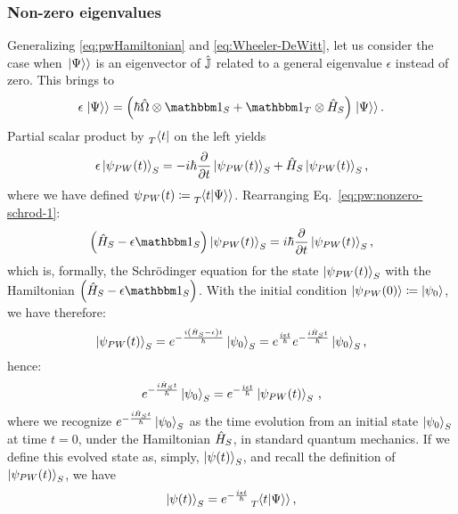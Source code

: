 \subsubsection{Non-zero eigenvalues}
Generalizing \eqref{eq:pwHamiltonian} and \eqref{eq:Wheeler-DeWitt}, let us consider the case when
$\left.\left| \Psi \right\rangle\right\rangle$ is an eigenvector of $\hat{\mathbb{J}}$ related to a general eigenvalue $\epsilon$
instead of zero. This brings to
\begin{equation}\label{eq:pw:non0e:first}
  \epsilon \dket{\Psi} = \qty(\hbar\op{\Omega} \ox \idop_S + \idop_T \ox \op{H}_S) \dket{\Psi} \text{.}
\end{equation}
Partial scalar product by $\prescript{}{T}{\bra{t}}$ on the left yields
\begin{equation}\label{eq:pw:nonzero-schrod-1}
  \epsilon\ket{\psi_{PW}(t)}_{S} = -i\hbar\pdv{t}\ket{\psi_{PW}(t)}_{S} + \hat{H}_S\ket{\psi_{PW}(t)}_{S}
  \text{,}
\end{equation}
where we have defined $\psi_{PW}(t) \coloneqq \prescript{}{T}{\!\left.\left\langle t \middle| \Psi \right\rangle\right\rangle}$.
Rearranging Eq.~\eqref{eq:pw:nonzero-schrod-1}:
\begin{equation}\label{eq:pw:nonzero-schrod-2}
   \qty(\op{H}_S - \epsilon \idop_{S}) \ket{\psi_{PW}(t)}_{S} = i\hbar\pdv{t}\ket{\psi_{PW}(t)}_{S}
   \text{,}
\end{equation}
which is, formally, the Schr\"{o}dinger equation
for the state $\ket{\psi_{PW}(t)}_{S}$ with
the Hamiltonian $\qty(\op{H}_S - \epsilon \idop_{S})$.
With the initial condition $\ket{\psi_{PW}(0)} \coloneqq \ket{\psi_0}$, we have therefore:
\begin{equation}\label{eq:pw:non0e:last}
  \ket{\psi_{PW}(t)}_S =
  e^{-\frac{i \qty(\hat{H}_{S} - \epsilon) t}{\hbar}} \ket{\psi_0}_S =
  e^{\frac{i \epsilon t}{\hbar}} e^{-\frac{i \hat{H}_{S} t}{\hbar}} \ket{\psi_0}_S
  \text{,}
\end{equation}
hence:
\begin{equation}
  e^{-\frac{i \hat{H}_{S} t}{\hbar}} \ket{\psi_0}_S = e^{-\frac{i \epsilon t}{\hbar}} \ket{\psi_{PW}(t)}_S
  \,\text{,}
\end{equation}
where we recognize $e^{-\frac{i \hat{H}_{S} t}{\hbar}} \ket{\psi_0}_S$ as the time evolution
from an initial state $\ket{\psi_0}_S$ at time $t = 0$,
under the Hamiltonian $\hat{H}_S$,
in standard quantum mechanics.
If we define this evolved state as, simply, $\ket{\psi(t)}_S$, and recall the definition of $\ket{\psi_{PW}(t)}_S$,
we have
\begin{equation}\label{eq:pw:nonzero_eigenJ__phase_term}
  \ket{\psi(t)}_S = e^{-\frac{i \epsilon t}{\hbar}} \prescript{}{T}{\!\left.\left\langle t \middle| \Psi \right\rangle\right\rangle} \, \text{,}
\end{equation}
